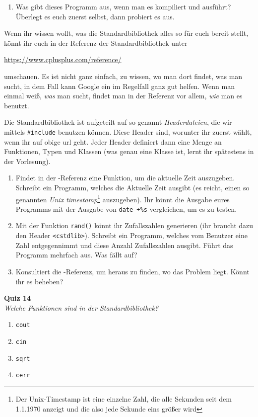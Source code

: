 \begin{praxis}
	\begin{enumerate}
		\item Was gibt dieses Programm aus, wenn man es kompiliert und ausführt?
		      Überlegt es euch zuerst selbst, dann probiert es aus.
	\end{enumerate}

	Wenn ihr wissen wollt, was die Standardbibliothek alles so für euch bereit
	stellt, könnt ihr euch in der Referenz der Standardbibliothek unter

	\url{https://www.cplusplus.com/reference/}

	umschauen. Es ist nicht ganz einfach, zu wissen, wo man dort findet, was man
	sucht, in dem Fall kann Google ein im Regelfall ganz gut helfen. Wenn man
	einmal weiß, \emph{was} man sucht, findet man in der Referenz vor allem,
	\emph{wie} man es benutzt.

	Die Standardbibliothek ist aufgeteilt auf so genannt \emph{Headerdateien}, die
	wir mittels \texttt{\#include} benutzen können. Diese Header sind, worunter ihr
	zuerst wählt, wenn ihr auf obige url geht. Jeder Header definiert dann eine
	Menge an Funktionen, Typen und Klassen (was genau eine Klasse ist, lernt ihr
	spätestens in der Vorlesung).

	\begin{enumerate}[resume]
		\item Findet in der \Cpp-Referenz eine Funktion, um die aktuelle Zeit
		      auszugeben. Schreibt ein Programm, welches die Aktuelle Zeit ausgibt
		      (es reicht, einen so genannten \emph{Unix timestamp}\footnote{Der
			      Unix-Timestamp ist eine einzelne Zahl, die alle Sekunden seit dem
			      1.1.1970 anzeigt und die also jede Sekunde eins größer wird} auszugeben).
		      Ihr könnt die Ausgabe eures Programms mit der Ausgabe von \texttt{date
			      +\%s} vergleichen, um es zu testen.
		\item Mit der Funktion \texttt{rand()} könnt ihr Zufallszahlen generieren
		      (ihr braucht dazu den Header \texttt{<cstdlib>}). Schreibt ein
		      Programm, welches vom Benutzer eine Zahl entgegennimmt und diese Anzahl
		      Zufallszahlen ausgibt. Führt das Programm mehrfach aus. Was fällt auf?
		\item Konsultiert die \Cpp-Referenz, um heraus zu finden, wo das Problem
		      liegt. Könnt ihr es beheben?
	\end{enumerate}
\end{praxis}



\newpage

\textbf{Quiz 14}\\
\textit{Welche Funktionen sind in der Standardbibliothek?}
\begin{enumerate}[label=\alph*)]
	\item \texttt{cout}
	\item \texttt{cin}
	\item \texttt{sqrt}
	\item \texttt{cerr}
\end{enumerate}
